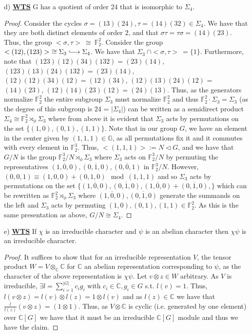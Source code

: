 \documentclass{article}
\newcommand{\bb}[1]{\mathbb{#1}}
\newcommand{\iso}{\cong}
\newcommand{\into}{\lhook\joinrel\longrightarrow}
\begin{document}
\newpage

d) \textbf{\underline{WTS}} G has a quotient of order 24 that is isomorphic to $\Sigma_{4}$.
\begin{proof}
  Consider the cycles $\sigma = (13)(24), \tau = (14)(32) \in \Sigma_{4}$. We have that they are both distinct elements of order $2$, and that $\sigma \tau = \tau \sigma = (14)(23)$. Thus, the group $<\sigma, \tau> \ \iso \ \bb{F}_{2}^{2}$. Consider the group $<(12), (123)>  \ \iso \Sigma_{3} \into \Sigma_{4}$. We have that $\Sigma_{3} \ \cap <\sigma, \tau> \ = \{1\}$. Furthermore, note that $(123)(12)(34)(132) = (23)(14)$, $(123)(13)(24)(132) = (23)(14)$, $(12)(12)(34)(12) = (12)(34)$, $(12)(13)(24)(12)$ = $(14)(23)$, $(12)(14)(23)(12) = (24)(13)$. Thus, as the generators normalize $\bb{F}_{2}^{2}$ the entire subgroup $\Sigma_{3}$ must normalize $\bb{F}_{2}^{2}$ and thus $\bb{F}_{2}^{2}\cdot \Sigma_{3} = \Sigma_{3}$ (as the degree of this subgroup is 24 = $|\Sigma_{4}|$) can be written as a semidirect product $\Sigma_{4} \iso \bb{F}_{2}^{2} \rtimes_{\phi} \Sigma_{3}$ where from above it is evident that $\Sigma_{3}$ acts by permutations on the set $\{(1,0), (0,1), (1,1)\}$. 
  Note that in our group $G$, we have an element in the center given by $(1,1,1) \in \bb{G}$, as all permutations fix it and it commutes with every element in $\bb{F}_{2}^{3}$. Thus, $<(1,1,1)>:= N \triangleleft G$, and we have that $G/N$ is the group $\bb{F}_{2}^{3}/N \rtimes_{\phi} \Sigma_{3}$ where $\Sigma_{3}$ acts on $\bb{F}_{2}^{3}/N$ by permuting the representatives $\overline{(1,0,0)}, \overline{(0,1,0)}, \overline{(0,0,1)}$ in $\bb{F}_{2}^{3}/N$. However, $(0,0,1) \equiv (1,0,0) + (0,1,0) \mod (1,1,1)$ and so $\Sigma_{3}$ acts by permutations on the set $\{\overline{(1,0,0)}, \overline{(0,1,0)}, \overline{(1,0,0)}+ \overline{(0,1,0)},\} $ which can be rewritten as $\bb{F}_{2}^{2} \rtimes_{\phi}\Sigma_{3}$ where $\overline{(1,0,0)}, \overline{(0,1,0)}$ generate the summands on the left and $\Sigma_{3}$ acts by permuting $(1,0),(0,1),(1,1) \in \bb{F}_{2}^{2}$. As this is the same presentation as above, $G/N \iso \Sigma_{4}$.
\end{proof}

e) \textbf{\underline{WTS}} If $\chi$ is an irreducible character and $\psi$ is an abelian character then $\chi \psi$ is an irreducible character.
\begin{proof}
  It suffices to show that for an irreducible representation $V$, the tensor product $W = V \otimes_{\bb{C}} \bb{C}$ for $\bb{C}$ an abelian representation corresponding to $\psi$, as the character of the above representation is $\chi \psi$. Let $v \otimes z \in W$ arbitrary. As $V$ is irreducible, $\exists l = \sum_{i=1}^{|G|} c_{i}g_{i}$ with $c_{i} \in \bb{C}, g_{i} \in G$ s.t. $l(v) = 1$. Thus, $l(v\otimes z) = l(v) \otimes l(z) = 1 \otimes l(v)$ and as $l(z) \in \bb{C}$ we have that $\frac{l}{l(z)}(v \otimes z) = (1 \otimes 1)$. Thus, as $V \otimes \bb{C}$ is cyclic (i.e. generated by one element) over $\bb{C}[G]$ we have that it must be an irreducible $\bb{C}[G]$ module and thus we have the claim.
\end{proof}
\end{document}
